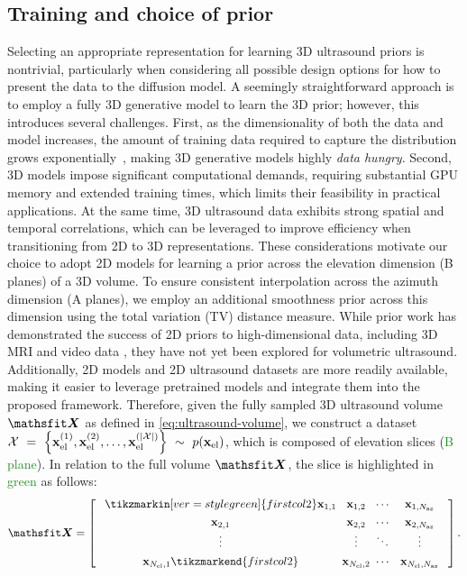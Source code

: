 \documentclass[journal,twoside,web,dvipsnames]{ieeecolor}          %
\begin{document}
\subsection{Training and choice of prior}\label{sec:prior}
Selecting an appropriate representation for learning 3D ultrasound priors is nontrivial, particularly when considering all possible design options for how to present the data to the diffusion model. A seemingly straightforward approach is to employ a fully 3D generative model to learn the 3D prior; however, this introduces several challenges. First, as the dimensionality of both the data and model increases, the amount of training data required to capture the distribution grows exponentially~\cite{koppen2000curse}, making 3D generative models highly \emph{data hungry}. Second, 3D models impose significant computational demands, requiring substantial GPU memory and extended training times, which limits their feasibility in practical applications. At the same time, 3D ultrasound data exhibits strong spatial and temporal correlations, which can be leveraged to improve efficiency when transitioning from 2D to 3D representations. These considerations motivate our choice to adopt 2D models for learning a prior across the elevation dimension (B planes) of a 3D volume. To ensure consistent interpolation across the azimuth dimension (A planes), we employ an additional smoothness prior across this dimension using the total variation (TV) distance measure.
While prior work has demonstrated the success of 2D priors to high-dimensional data, including 3D MRI\cite{chung2023solving} and video data \cite{daras2024warped, stevens2024sequential}, they have not yet been explored for volumetric ultrasound. Additionally, 2D models and 2D ultrasound datasets are more readily available, making it easier to leverage pretrained models and integrate them into the proposed framework. Therefore, given the fully sampled 3D ultrasound volume $\tX$ as defined in \eqref{eq:ultrasound-volume}, we construct a dataset $\mathcal{X}~=~\left\{{\mathbf{x}}_{\text{el}}^{(1)}, {\mathbf{x}}_{\text{el}}^{(2)}, \ldots,  {\mathbf{x}}_\text{el}^{(|\mathcal{X}|)}\right\}~\sim~p({\mathbf{x}}_\text{el})$, which is composed of elevation slices (\textcolor{ForestGreen}{B plane}). In relation to the full volume $\tX$, the slice is highlighted in \textcolor{ForestGreen}{green} as follows:
\begin{equation}
    \tX =
    \left[\begin{array}{@{\hspace{0.8em}}c@{\hspace{0.5em}}c@{\hspace{0.5em}}c@{\hspace{1em}}c@{\hspace{0.8em}}}
        \tikzmarkin[ver=style green]{firstcol2}\rvx_{1,1} & \rvx_{1,2} & \cdots & \rvx_{1,N_\text{az}} \\[0.4em]
        \rvx_{2,1} & \rvx_{2,2} & \cdots & \rvx_{2,N_\text{az}} \\
        \vdots & \vdots & \ddots & \vdots \\[0.4em]
        \rvx_{N_\text{el},1}\tikzmarkend{firstcol2} & \rvx_{N_\text{el},2} & \cdots & \rvx_{N_\text{el},N_\text{az}}
    \end{array}\right].
\end{equation}
\end{document}
